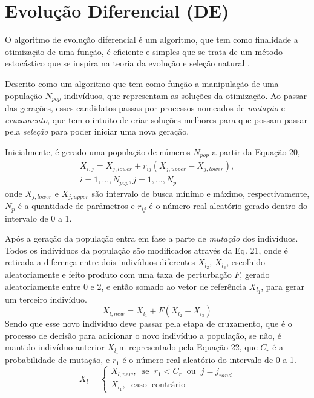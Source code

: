 \documentclass[por]{Template_SBEF}
\begin{document}
\section{Evolução Diferencial (DE)}
O algoritmo de evolução diferencial é um algoritmo, que tem como finalidade a otimização de uma função, é eficiente e simples que se trata de um método estocástico que se inspira na teoria da evolução e seleção natural \cite{Storn}.

Descrito como um algoritmo que tem como função a manipulação de uma população $N_{pop}$ indivíduos, que representam as soluções da otimização\cite{leppaus}. Ao passar das gerações, esses candidatos passas por processos nomeados de \textit{mutação} e \textit{cruzamento}, que tem o intuito de criar soluções melhores para que possam passar pela \textit{seleção} para poder iniciar uma nova geração.

Inicialmente, é gerado uma população de números $N_{pop}$ a partir da Equação 20,
\begin{equation}
\begin{split}
X_{i,j}=X_{j,lower}+r_{ij} (X_{j,upper}-X_{j,lower}),\\
i = 1,...,N_{pop}, j =1, ..., N_p
\end{split}
\end{equation}
onde $X_{j,lower}$ e $X_{j,upper}$ são intervalo de busca mínimo e máximo, respectivamente, $N_p$ é a quantidade de parâmetros e $r_{ij}$ é o número real aleatório gerado dentro do intervalo de 0 a 1.

Após a geração da população entra em fase a parte de \textit{mutação} dos indivíduos. Todos os indivíduos da população são modificados através da Eq. 21, onde é retirada a diferença entre dois indivíduos  diferentes $X_{l_2}$, $X_{l_3}$, escolhido aleatoriamente e feito produto com uma taxa de perturbação $F$, gerado aleatoriamente entre 0 e 2, e então somado ao vetor de referência $X_{l_1}$, para gerar um terceiro indivíduo.
\begin{equation}
X_{l,new}=X_{l_1} + F(X_{l_2} - X_{l_3})
\end{equation}
Sendo que esse novo indivíduo deve passar pela etapa de cruzamento, que é o processo de decisão para adicionar o novo indivíduo a população, se não, é mantido  indivíduo anterior $X_{l_1}$m representado pela Equação 22, que $C_r$ é a probabilidade de mutação, e $r_1$ é o número real aleatório do intervalo de 0 a 1.
\begin{equation}
X_l= \left\{\begin{matrix}
X_{l,new},\hspace{7pt} \mathrm{se}\hspace{7pt} r_1 < C_r \hspace{7pt}\mathrm{ou} \hspace{7pt} j = j_{rand}\\
 X_{l_1},\hspace{7pt} \mathrm{caso} \hspace{7pt}\mathrm{contrário}

\end{matrix}\right.
\end{equation}
\end{document}
